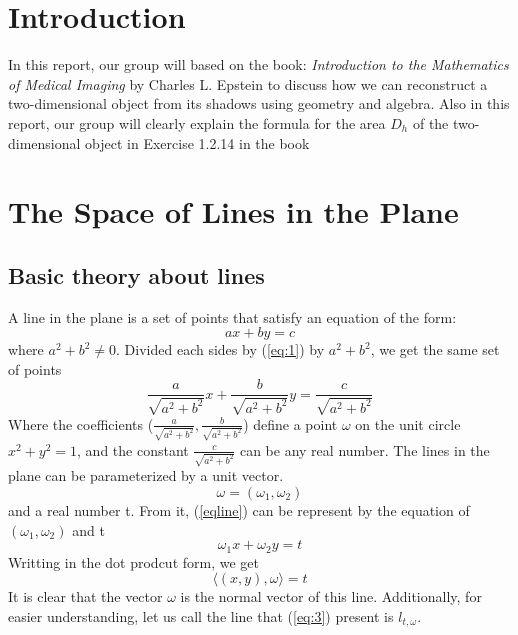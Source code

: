\documentclass[a4paper]{article}
\begin{document}
\section{Introduction}
In this report, our group will based on the book:\textit{ Introduction to the Mathematics of Medical Imaging} by Charles L. Epstein to discuss how we can reconstruct a two-dimensional object from its shadows using geometry and algebra. Also in this report, our group will clearly explain the formula for the area $D_h$ of the two-dimensional object in Exercise 1.2.14 in the book
\section{The Space of Lines in the Plane}
\subsection{Basic theory about lines}
A line in the plane is a set of points that satisfy an equation of the form:
\begin{equation}\label{eq:1}
    ax + by = c
\end{equation}
where $a^2+b^2\neq 0$. Divided each sides by (\ref{eq:1}) by $a^2+b^2$, we get the same set of points
\begin{equation}\label{eqline}
    \frac{a}{\sqrt{a^2+b^2}}x + \frac{b}{\sqrt{a^2+b^2}}y = \frac{c}{\sqrt{a^2+b^2}}
\end{equation}
Where the coefficients ($\frac{a}{\sqrt{a^2+b^2}},\frac{b}{\sqrt{a^2+b^2}}$) define a point $\omega$ on the unit circle $x^2 + y^2 = 1$, and the constant $\frac{c}{\sqrt{a^2+b^2}}$ can be any real number. The lines in the plane can be parameterized by a unit vector.
\begin{equation*}
    \omega = (\omega_1,\omega_2)
\end{equation*}
and a real number t. From it, (\ref{eqline}) can be represent by the equation of $(\omega_1,\omega_2)$ and t
\begin{equation}\label{parafull}
    \omega_1 x + \omega_2 y = t
\end{equation}
Writting in the dot prodcut form, we get
\begin{equation}\label{eq:3}
    \langle (x,y), \omega \rangle = t
\end{equation}
It is clear that the vector $\omega$ is the normal vector of this line. Additionally, for easier understanding, let us call the line that (\ref{eq:3}) present is $l_{t,\omega}$.\\ \\
\end{document}
